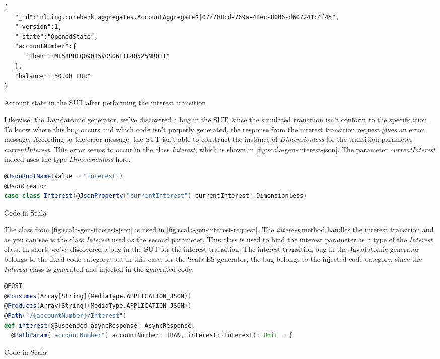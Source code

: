 \begin{sourcecode}[h!]
\begin{lstlisting}[]
{
   "_id":"nl.ing.corebank.aggregates.AccountAggregate$|077708cd-769a-48ec-8006-d607241c4f45",
   "_version":1,
   "_state":"OpenedState",
   "accountNumber":{
      "iban":"MT58PDLQ09015VOS06LIF4Q525NRO1I"
   },
   "balance":"50.00 EUR"
}
\end{lstlisting}
\caption{Account state in the SUT after performing the interest transition}
\label{fig:interest-opened-account-scalaes-json}
\end{sourcecode}

Likewise, the Javadatomic generator, we've discovered a bug in the SUT, since the simulated transition isn't conform to the specification. To know where this bug occurs and which code isn't properly generated, the response from the interest transition request gives an error message. According to the error message, the SUT isn't able to construct the instance of \textit{Dimensionless} for the transition parameter \textit{currentInterest}. This error seems to occur in the class \textit{Interest}, which is shown in \autoref{fig:scala-gen-interest-json}. The parameter \textit{currentInterest} indeed uses the type \textit{Dimensionless} here.

\begin{sourcecode}[h!]
\begin{lstlisting}[language=scala]
@JsonRootName(value = "Interest")
@JsonCreator
case class Interest(@JsonProperty("currentInterest") currentInterest: Dimensionless)
\end{lstlisting}
\caption{Code in Scala}
\label{fig:scala-gen-interest-json}
\end{sourcecode}

The class from \autoref{fig:scala-gen-interest-json} is used in \autoref{fig:scala-gen-interest-request}. The \textit{interest} method handles the interest transition and as you can see is the class \textit{Interest} used as the second parameter. This class is used to bind the interest parameter as a type of the \textit{Interest} class. In short, we've discovered a bug in the SUT for the interest transition. The interest transition bug in the Javadatomic generator belongs to the fixed code category, but in this case, for the Scala-ES generator, the bug belongs to the injected code category, since the \textit{Interest} class is generated and injected in the generated code.

\begin{sourcecode}[h!]
\begin{lstlisting}[language=scala]
@POST
@Consumes(Array[String](MediaType.APPLICATION_JSON))
@Produces(Array[String](MediaType.APPLICATION_JSON))
@Path("/{accountNumber}/Interest")
def interest(@Suspended asyncResponse: AsyncResponse, 
  @PathParam("accountNumber") accountNumber: IBAN, interest: Interest): Unit = {
\end{lstlisting}
\caption{Code in Scala}
\label{fig:scala-gen-interest-request}
\end{sourcecode}

